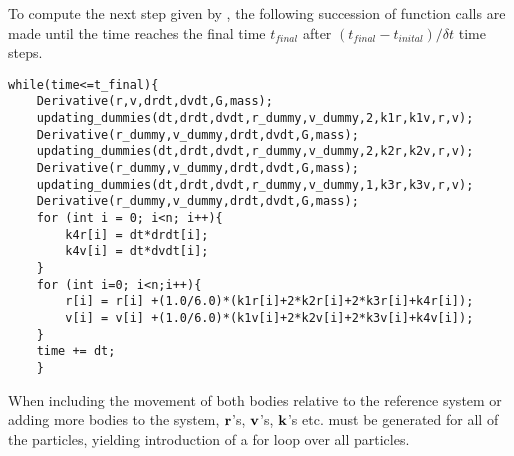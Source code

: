 To compute the next step given by , the following succession of function calls are made until the time reaches the final time $t_{final}$ after $(t_{final} - t_{inital}) / \delta t$ time steps.
\begin{lstlisting}
while(time<=t_final){
    Derivative(r,v,drdt,dvdt,G,mass);
    updating_dummies(dt,drdt,dvdt,r_dummy,v_dummy,2,k1r,k1v,r,v);
    Derivative(r_dummy,v_dummy,drdt,dvdt,G,mass);
    updating_dummies(dt,drdt,dvdt,r_dummy,v_dummy,2,k2r,k2v,r,v);
    Derivative(r_dummy,v_dummy,drdt,dvdt,G,mass);
    updating_dummies(dt,drdt,dvdt,r_dummy,v_dummy,1,k3r,k3v,r,v);
    Derivative(r_dummy,v_dummy,drdt,dvdt,G,mass);
    for (int i = 0; i<n; i++){
        k4r[i] = dt*drdt[i];
        k4v[i] = dt*dvdt[i];
    }
    for (int i=0; i<n;i++){
        r[i] = r[i] +(1.0/6.0)*(k1r[i]+2*k2r[i]+2*k3r[i]+k4r[i]);
        v[i] = v[i] +(1.0/6.0)*(k1v[i]+2*k2v[i]+2*k3v[i]+k4v[i]);
    }
    time += dt;
    }
\end{lstlisting}
When including the movement of both bodies relative to the reference system or adding more bodies to the system, $\mbox{\textbf{r}}$'s, $\mbox{\textbf{v}}$'s, $\mbox{\textbf{k}}$'s etc. must be generated for all of the particles, yielding introduction of a for loop over all particles.  